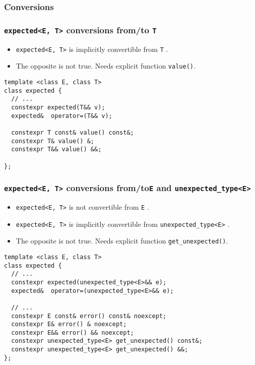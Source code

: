 \documentclass[xcolor=dvipsnames]{beamer}
\newcommand{\cpp}[1]{\lstinline{#1}}
\begin{document}
\subsubsection{Conversions}
\begin{frame}[fragile]
\frametitle{\cpp{expected<E, T>} conversions from/to \cpp{T}}

\begin{itemize}
\item \cpp{expected<E, T>} is implicitly convertible from \cpp{T} .
\item The opposite is not true. Needs explicit function \cpp{value()}.
\end{itemize}

\begin{lstlisting}
template <class E, class T>
class expected {
  // ...
  constexpr expected(T&& v);
  expected&  operator=(T&& v);
  
  constexpr T const& value() const&;
  constexpr T& value() &;
  constexpr T&& value() &&;
  
};
\end{lstlisting}

\end{frame}
\begin{frame}[fragile]
\frametitle{\cpp{expected<E, T>} conversions from/to\cpp{E} and \cpp{unexpected_type<E>}}

\begin{itemize}
\item \cpp{expected<E, T>} is not convertible from \cpp{E} .
\item \cpp{expected<E, T>} is implicitly convertible from \cpp{unexpected_type<E>} .
\item The opposite is not true. Needs explicit function \cpp{get_unexpected()}.
\end{itemize}

\begin{lstlisting}
template <class E, class T>
class expected {
  // ...
  constexpr expected(unexpected_type<E>&& e);
  expected&  operator=(unexpected_type<E>&& e);

  // ...  
  constexpr E const& error() const& noexcept;
  constexpr E& error() & noexcept;
  constexpr E&& error() && noexcept;
  constexpr unexpected_type<E> get_unexpected() const&;
  constexpr unexpected_type<E> get_unexpected() &&;
};
\end{lstlisting}

\end{frame}
\end{document}
